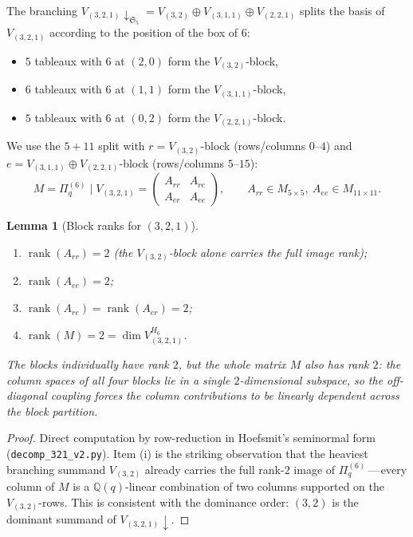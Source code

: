 \documentclass[11pt]{article}
\theoremstyle{plain}
\newtheorem{lemma}[theorem]{Lemma}
\theoremstyle{definition}
\theoremstyle{remark}
\newcommand{\Q}{\mathbb{Q}}
\newcommand{\Sym}{\mathfrak{S}}
\newcommand{\Pibs}{\Pi_q}
\begin{document}
The branching $V_{(3,2,1)}\downarrow_{\Sym_5} = V_{(3,2)} \oplus V_{(3,1,1)} \oplus V_{(2,2,1)}$
splits the basis of $V_{(3,2,1)}$ according to the position of the box of $6$:
\begin{itemize}[itemsep=0pt]
\item $5$ tableaux with $6$ at $(2,0)$ form the $V_{(3,2)}$-block,
\item $6$ tableaux with $6$ at $(1,1)$ form the $V_{(3,1,1)}$-block,
\item $5$ tableaux with $6$ at $(0,2)$ form the $V_{(2,2,1)}$-block.
\end{itemize}
We use the $5+11$ split with $r = V_{(3,2)}$-block (rows/columns $0$--$4$)
and $e = V_{(3,1,1)} \oplus V_{(2,2,1)}$-block (rows/columns $5$--$15$):
\[
  M = \Pibs^{(6)}\mid V_{(3,2,1)}
    = \begin{pmatrix} A_{rr} & A_{re} \\ A_{er} & A_{ee} \end{pmatrix},
  \qquad
  A_{rr} \in M_{5\times 5},\ A_{ee} \in M_{11\times 11}.
\]

\begin{lemma}[Block ranks for $(3,2,1)$]\label{lem:321-blocks}
\begin{enumerate}[label=(\roman*),itemsep=0pt]
\item $\operatorname{rank}(A_{rr}) = 2$ \emph{(the $V_{(3,2)}$-block alone carries the full image rank)};
\item $\operatorname{rank}(A_{ee}) = 2$;
\item $\operatorname{rank}(A_{re}) = \operatorname{rank}(A_{er}) = 2$;
\item $\operatorname{rank}(M) = 2 = \dim V_{(3,2,1)}^{H_6}$.
\end{enumerate}
The blocks individually have rank $2$, but the whole matrix $M$ also has
rank $2$: the column spaces of all four blocks lie in a single
$2$-dimensional subspace, so the off-diagonal coupling forces the column
contributions to be linearly dependent across the block partition.
\end{lemma}

\begin{proof}
Direct computation by row-reduction in Hoefsmit's seminormal form
(\verb|decomp_321_v2.py|). Item (i) is the striking observation that the
heaviest branching summand $V_{(3,2)}$ already carries the full rank-$2$
image of $\Pibs^{(6)}$\,---\,every column of $M$ is a $\Q(q)$-linear
combination of two columns supported on the $V_{(3,2)}$-rows. This is
consistent with the dominance order: $(3,2)$ is the dominant summand of
$V_{(3,2,1)}\downarrow$.
\end{proof}
\end{document}
